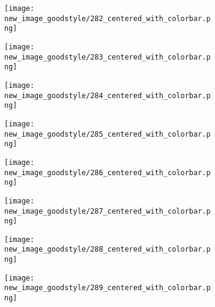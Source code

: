 \documentclass[a4paper,12pt]{article}
\begin{document}
\begin{figure}[H]
  \begin{subfigure}{0.11\textwidth}
    \texttt{[image: new\_image\_goodstyle/282\_centered\_with\_colorbar.png]}
  \end{subfigure}
  \hfill
  \begin{subfigure}{0.11\textwidth}
    \texttt{[image: new\_image\_goodstyle/283\_centered\_with\_colorbar.png]}
  \end{subfigure}
  \hfill
  \begin{subfigure}{0.11\textwidth}
    \texttt{[image: new\_image\_goodstyle/284\_centered\_with\_colorbar.png]}
  \end{subfigure}
  \hfill
  \begin{subfigure}{0.11\textwidth}
    \texttt{[image: new\_image\_goodstyle/285\_centered\_with\_colorbar.png]}
  \end{subfigure}
  \hfill
  \begin{subfigure}{0.11\textwidth}
    \texttt{[image: new\_image\_goodstyle/286\_centered\_with\_colorbar.png]}
  \end{subfigure}
  \hfill
  \begin{subfigure}{0.11\textwidth}
    \texttt{[image: new\_image\_goodstyle/287\_centered\_with\_colorbar.png]}
  \end{subfigure}
  \hfill
  \begin{subfigure}{0.11\textwidth}
    \texttt{[image: new\_image\_goodstyle/288\_centered\_with\_colorbar.png]}
  \end{subfigure}
  \hfill
  \begin{subfigure}{0.11\textwidth}
    \texttt{[image: new\_image\_goodstyle/289\_centered\_with\_colorbar.png]}
  \end{subfigure}
  \hfill
\end{figure}
\end{document}
